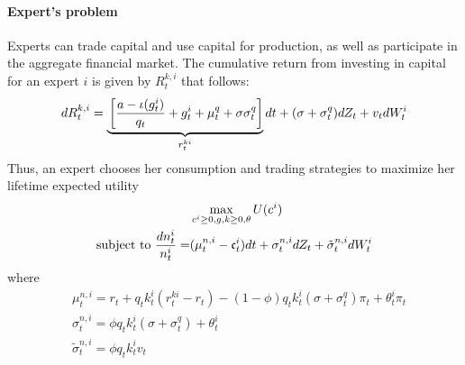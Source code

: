 \documentclass[12pt,english]{article}
\begin{document}
\paragraph{Expert's problem}
Experts can trade capital and use capital for production, as well as participate in the aggregate financial market. The cumulative return from investing in capital for an expert $i$ is given by $R_t^{k,i}$ that follows:
\begin{equation*}
dR_t^{k,i} = \underbrace{\vphantom{\frac{a}{b}} \left[ \frac{a - \iota(g_t^i)}{q_t} + g_t^i + \mu_t^q + \sigma\sigma_t^q\right]}_{r_t^{ki}}dt + (\sigma + \sigma_t^q)dZ_t + v_tdW_t^i
\end{equation*}
Thus, an expert chooses her consumption and trading strategies to maximize her lifetime expected utility
\begin{align*}
&\max_{c^i\geq0, g, k\geq0, \theta}U(c^i)\\
\text{subject to } \frac{dn_t^i}{n_t^i} = &(\mu_t^{n,i} - \frak{c}_t^i)dt + \sigma_t^{n,i}dZ_t + \tilde{\sigma}_t^{n,i}dW_t^i
\end{align*}
where 
\begin{align*}
&\mu_t^{n,i} = r_t + q_tk_t^i(r_t^{ki} - r_t) - (1 - \phi) q_tk_t^i(\sigma + \sigma_t^q)\pi_t + \theta_t^i\pi_t\\
&\sigma_t^{n,i} = \phi q_tk_t^i(\sigma + \sigma_t^q) + \theta_t^i\\
&\tilde{\sigma}_t^{n,i} = \phi q_tk_t^iv_t
\end{align*}
\end{document}
